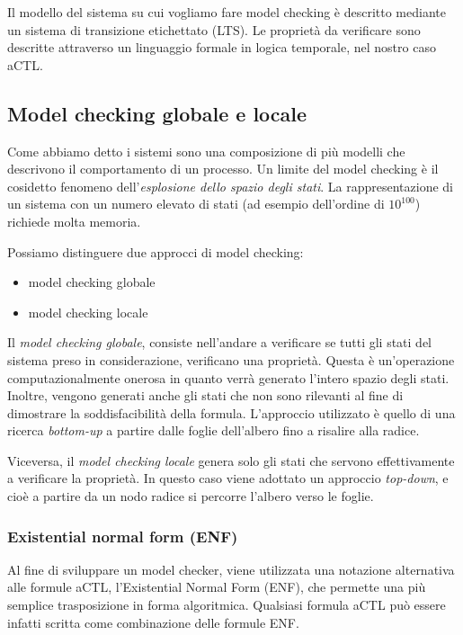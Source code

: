 Il modello del sistema su cui vogliamo fare model checking è descritto mediante un sistema di transizione etichettato (LTS). Le proprietà da verificare sono descritte attraverso un linguaggio formale in logica temporale, nel nostro caso aCTL.

\subsection{Model checking globale e locale}

Come abbiamo detto i sistemi sono una composizione di più modelli che descrivono il comportamento di un processo. Un limite del model checking è il cosidetto fenomeno dell'\emph{esplosione dello spazio degli stati}. La rappresentazione di un sistema con un numero elevato di stati (ad esempio dell'ordine di $10^{100}$) richiede molta memoria. 

Possiamo distinguere due approcci di model checking:
\begin{itemize}
 \item model checking globale
 \item model checking locale
\end{itemize}

Il \emph{model checking globale}, consiste nell'andare a verificare se tutti gli stati del sistema preso in considerazione, verificano una proprietà. Questa è un'operazione computazionalmente onerosa in quanto verrà generato l'intero spazio degli stati. Inoltre, vengono generati anche gli stati che non sono rilevanti al fine di dimostrare la soddisfacibilità della formula. 
L'approccio utilizzato è quello di una ricerca \textit{bottom-up} a partire dalle foglie dell'albero fino a risalire alla radice.

Viceversa, il \emph{model checking locale} genera solo gli stati che servono effettivamente a verificare la proprietà. In questo caso viene adottato un approccio \textit{top-down}, e cioè a partire da un nodo radice si percorre l'albero verso le foglie.

\clearpage
\subsubsection{Existential normal form (ENF)}

Al fine di sviluppare un model checker, viene utilizzata una notazione alternativa alle formule aCTL, l'Existential Normal Form (ENF), che permette una più semplice trasposizione in forma algoritmica.
Qualsiasi formula aCTL può essere infatti scritta come combinazione delle formule ENF.

